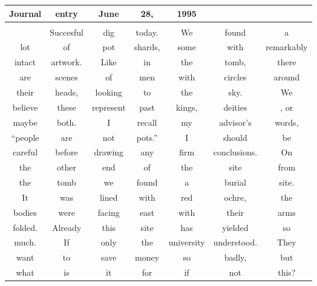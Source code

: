 {
  \Large
  \normalfont\wedn
\begin{tabular}{|ccccccc|}
  \hline
  Journal & entry & June & 28, & 1995 & & \\
  \hline
          & & & & & & \\
  \hline
          & Succesful & dig & today. & We & found & a \\
  \hline
  lot & of & pot & shards, & some & with & remarkably \\
  \hline
  intact & artwork. & Like & in & the & tomb, & there \\
  \hline
  are & scenes & of & men & with & circles & around \\
  \hline
  their & heads, & looking & to & the & sky. & We \\
  \hline
  believe & these & represent & past & kings, & deities &, or \\
  \hline
  maybe & both. & I & recall & my & advisor's & words, \\
  \hline
  ``people & are & not & pots.'' & I & should & be \\
  \hline
  careful & before & drawing & any & firm & conclusions. & On \\
  \hline
  the & other & end & of & the & site & from \\
  \hline
  the & tomb & we & found & a & burial & site. \\
  \hline
  It & was & lined & with & red & ochre, & the \\
  \hline
  bodies & were & facing & east & with & their & arms \\
  \hline
  folded. & Already & this & site & has & yielded & so \\
  \hline
  much. & If & only & the & university & understood. & They \\
  \hline
  want & to & save & money & so & badly, & but \\
  \hline
  what & is & it & for & if & not & this? \\
  \hline
\end{tabular}
}